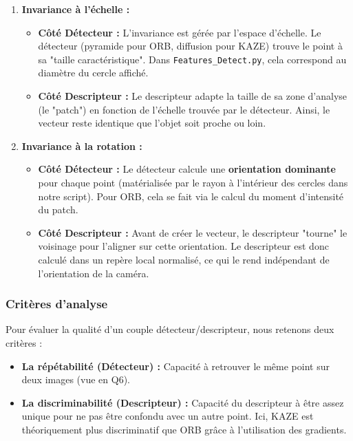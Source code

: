 \documentclass[11pt,a4paper]{article}
\begin{document}
\begin{enumerate}
    \item \textbf{Invariance à l'échelle :}
    \begin{itemize}
        \item \textbf{Côté Détecteur :} L'invariance est gérée par l'espace d'échelle. Le détecteur (pyramide pour ORB, diffusion pour KAZE) trouve le point à sa "taille caractéristique". Dans \texttt{Features\_Detect.py}, cela correspond au diamètre du cercle affiché.
        \item \textbf{Côté Descripteur :} Le descripteur adapte la taille de sa zone d'analyse (le "patch") en fonction de l'échelle trouvée par le détecteur. Ainsi, le vecteur reste identique que l'objet soit proche ou loin.
    \end{itemize}

    \item \textbf{Invariance à la rotation :}
    \begin{itemize}
        \item \textbf{Côté Détecteur :} Le détecteur calcule une \textbf{orientation dominante} pour chaque point (matérialisée par le rayon à l'intérieur des cercles dans notre script). Pour ORB, cela se fait via le calcul du moment d'intensité du patch.
        \item \textbf{Côté Descripteur :} Avant de créer le vecteur, le descripteur "tourne" le voisinage pour l'aligner sur cette orientation. Le descripteur est donc calculé dans un repère local normalisé, ce qui le rend indépendant de l'orientation de la caméra.
    \end{itemize}
\end{enumerate}

\subsubsection{Critères d'analyse}

Pour évaluer la qualité d'un couple détecteur/descripteur, nous retenons deux critères :
\begin{itemize}
    \item \textbf{La répétabilité (Détecteur) :} Capacité à retrouver le même point sur deux images (vue en Q6).
    \item \textbf{La discriminabilité (Descripteur) :} Capacité du descripteur à être assez unique pour ne pas être confondu avec un autre point. Ici, KAZE est théoriquement plus discriminatif que ORB grâce à l'utilisation des gradients.
\end{itemize}
\end{document}
